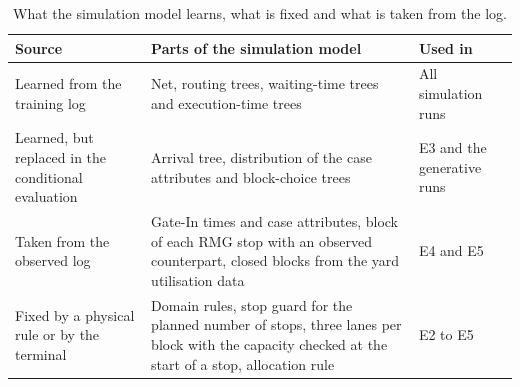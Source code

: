 \begin{table}[htbp]
\centering
\footnotesize
\setlength{\tabcolsep}{4pt}
\begin{tabularx}{\textwidth}{L{3.6cm}YL{2.6cm}}
\toprule
\textbf{Source} & \textbf{Parts of the simulation model} & \textbf{Used in} \\
\midrule
Learned from the training log & Net, routing trees, waiting-time trees and execution-time trees & All simulation runs \\
\addlinespace
Learned, but replaced in the conditional evaluation & Arrival tree, distribution of the case attributes and block-choice trees & E3 and the generative runs \\
\addlinespace
Taken from the observed log & Gate-In times and case attributes, block of each RMG stop with an observed counterpart, closed blocks from the yard utilisation data & E4 and E5 \\
\addlinespace
Fixed by a physical rule or by the terminal & Domain rules, stop guard for the planned number of stops, three lanes per block with the capacity checked at the start of a stop, allocation rule & E2 to E5 \\
\bottomrule
\end{tabularx}
\par{}
\caption{What the simulation model learns, what is fixed and what is taken from the log.}
\label{tab:exp_sources}
\end{table}
